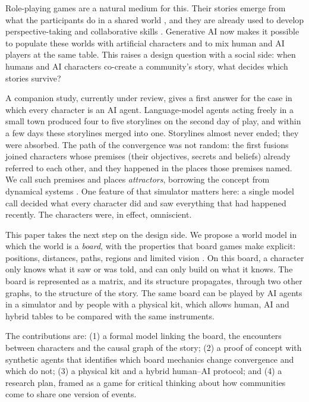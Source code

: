 \documentclass[11pt]{article}
\begin{document}
Role-playing games are a natural medium for this. Their stories emerge from
what the participants do in a shared world \parencite{fine1983,montola2008},
and they are already used to develop perspective-taking and collaborative
skills \parencite{bowman2010,daniau2016}. Generative AI now makes it possible
to populate these worlds with artificial characters \parencite{park2023} and
to mix human and AI players at the same table. This raises a design
question with a social side: when humans and AI characters co-create a
community's story, what decides which stories survive?

A companion study, currently under review, gives a first answer for the
case in which every character is an AI agent. Language-model agents acting
freely in a small town produced four to five storylines on the second day of
play, and within a few days these storylines merged into one. Storylines
almost never ended; they were absorbed. The path of the convergence was not
random: the first fusions joined characters whose premises (their
objectives, secrets and beliefs) already referred to each other, and they
happened in the places those premises named. We call such premises and
places \emph{attractors}, borrowing the concept from dynamical systems
\parencite{strogatz2015}. One feature of that simulator matters here: a single
model call decided what every character did and saw everything that had
happened recently. The characters were, in effect, omniscient.

This paper takes the next step on the design side. We propose a world model
in which the world is a \emph{board}, with the properties that board games
make explicit: positions, distances, paths, regions and limited vision
\parencite{woods2012,salen2004}. On this board, a character only knows what
it saw or was told, and can only build on what it knows. The board is
represented as a matrix, and its structure propagates, through two other
graphs, to the structure of the story. The same board can be played by AI
agents in a simulator and by people with a physical kit, which allows human,
AI and hybrid tables to be compared with the same instruments.

The contributions are: (1) a formal model linking the board, the encounters
between characters and the causal graph of the story; (2) a proof of concept
with synthetic agents that identifies which board mechanics change
convergence and which do not; (3) a physical kit and a hybrid human--AI
protocol; and (4) a research plan, framed as a game for critical thinking
about how communities come to share one version of events.
\end{document}
